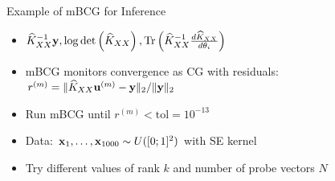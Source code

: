 \documentclass{beamer}
\begin{document}

\begin{frame}{Example of mBCG for Inference}
\begin{itemize}[<+->]
    \item $\widehat K_{XX}^{-1} \boldsymbol{\mathbf{y}}, \log \det \left( \widehat K_{XX} \right), \operatorname{Tr} \left( \widehat K_{XX}^{-1} \frac{d \widehat K_{XX}}{d\theta_i} \right)$
    \item mBCG monitors convergence as CG with residuals: $r^{(m)} = \Vert \widehat K_{XX} \boldsymbol{\mathbf{u}}^{(m)} - \boldsymbol{\mathbf{y}} \Vert_2 / \Vert \boldsymbol{\mathbf{y}} \Vert_2$
    \item Run mBCG until $r^{(m)} < \text{tol}=10^{-13}$
    \item Data: $\boldsymbol{\mathbf{x}}_1, \ldots, \boldsymbol{\mathbf{x}}_{1000} \sim \mathcal \mathcal U([0;1]^2)$ with SE kernel
    \item Try different values of rank $k$ and number of probe vectors $N$
\end{itemize}
\end{frame}
\end{document}
